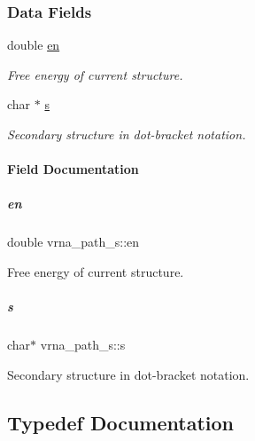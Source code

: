 \subsubsection*{Data Fields}
\begin{DoxyCompactItemize}
\item 
double \mbox{\hyperlink{group__direct__paths_ac25160bf31d28097358278f367e41227}{en}}
\begin{DoxyCompactList}\small\item\em Free energy of current structure. \end{DoxyCompactList}\item 
char $\ast$ \mbox{\hyperlink{group__direct__paths_a141b70a59cb81d10bc65bbb7a0f6db77}{s}}
\begin{DoxyCompactList}\small\item\em Secondary structure in dot-\/bracket notation. \end{DoxyCompactList}\end{DoxyCompactItemize}


\paragraph{Field Documentation}
\mbox{\label{group__direct__paths_ac25160bf31d28097358278f367e41227}} 
\subparagraph{\texorpdfstring{en}{en}}
{\footnotesize\ttfamily double vrna\+\_\+path\+\_\+s\+::en}



Free energy of current structure. 

\mbox{\label{group__direct__paths_a141b70a59cb81d10bc65bbb7a0f6db77}} 
\subparagraph{\texorpdfstring{s}{s}}
{\footnotesize\ttfamily char$\ast$ vrna\+\_\+path\+\_\+s\+::s}



Secondary structure in dot-\/bracket notation. 



\subsection{Typedef Documentation}
\mbox{\label{group__direct__paths_ga818d4f3d1cf8723d6905990b08d909fe}} 
